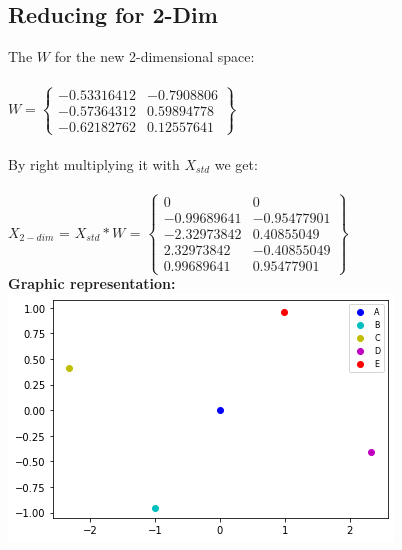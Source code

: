 \subsection{Reducing for 2-Dim}
The $W$ for the new 2-dimensional space:\\
\\
$W = \begin{Bmatrix}
-0.53316412 & -0.7908806\\
-0.57364312 & 0.59894778\\
-0.62182762 & 0.12557641
\end{Bmatrix}$\\
\\
By right multiplying it with $X_{std}$ we get:\\ 
\\
$X_{2-dim}$ = $X_{std}*W$ = $\begin{Bmatrix}
0 & 0\\
-0.99689641 & -0.95477901\\
-2.32973842 & 0.40855049\\
2.32973842 & -0.40855049\\
0.99689641 & 0.95477901
\end{Bmatrix}$
\\
\textbf{Graphic representation:}\\
\includegraphics[scale = 0.8, width=\textwidth]{graphic2}

